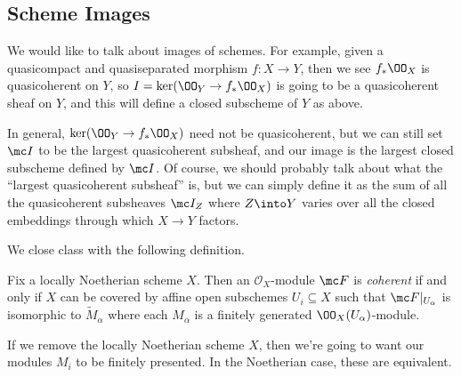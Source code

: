 \documentclass[../notes.tex]{subfiles}
\begin{document}
\subsection{Scheme Images}
We would like to talk about images of schemes. For example, given a quasicompact and quasiseparated morphism $f\colon X\to Y$, then we see $f_*\OO_X$ is quasicoherent on $Y$, so $I=\ker(\OO_Y\to f_*\OO_X)$ is going to be a quasicoherent sheaf on $Y$, and this will define a closed subscheme of $Y$ as above.

In general, $\ker(\OO_Y\to f_*\OO_X)$ need not be quasicoherent, but we can still set $\mc I$ to be the largest quasicoherent subsheaf, and our image is the largest closed subscheme defined by $\mc I$. Of course, we should probably talk about what the ``largest quasicoherent subsheaf'' is, but we can simply define it as the sum of all the quasicoherent subsheaves $\mc I_Z$ where $Z\into Y$ varies over all the closed embeddings through which $X\to Y$ factors.

We close class with the following definition.
\begin{definition}
	Fix a locally Noetherian scheme $X$. Then an $\mathcal O_X$-module $\mc F$ is \textit{coherent} if and only if $X$ can be covered by affine open subschemes $U_i\subseteq X$ such that $\mc F|_{U_\alpha}$ is isomorphic to $\widetilde M_\alpha$ where each $M_\alpha$ is a finitely generated $\OO_X(U_\alpha)$-module.
\end{definition}
\begin{remark}
	If we remove the locally Noetherian scheme $X$, then we're going to want our modules $M_i$ to be finitely presented. In the Noetherian case, these are equivalent.
\end{remark}
\end{document}
